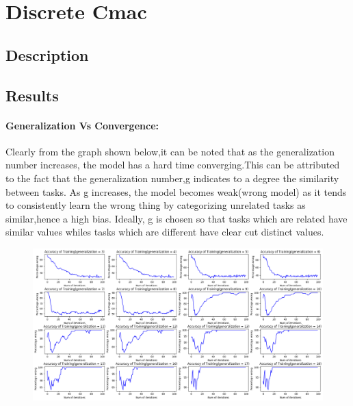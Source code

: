 \documentclass{article}
\begin{document}
\section{Discrete Cmac}
\subsection{Description}
\subsection{Results}
  \paragraph{Generalization Vs Convergence:}
   Clearly from the graph shown below,it can be noted that  
  as the generalization number increases, the model has a hard time converging.This can
  be attributed to the fact that the generalization number,g indicates to a degree the similarity
  between tasks. As g increases, the model becomes weak(wrong model) as it tends to consistently learn the wrong thing by categorizing unrelated tasks 
  as similar,hence a high bias. Ideally, g is chosen so that tasks which are related have similar values whiles tasks
  which are different have clear cut distinct values. 
  \begin{figure}[h!]
     \centering
    \includegraphics[scale=0.35]{./Results/convergenceVsgeneralization.png}
  \end{figure}
\end{document}

